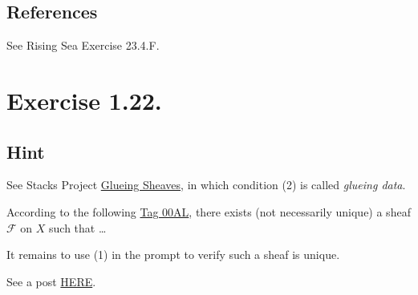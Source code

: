 \subsection{References}

See Rising Sea \cite{RaviRisingSea} Exercise 23.4.F.

\section{Exercise 1.22.}

\subsection{Hint}
See Stacks Project \href{https://stacks.math.columbia.edu/tag/00AK}{Glueing Sheaves}, in which condition (2) is called \textit{glueing data}. 

According to the following \href{https://stacks.math.columbia.edu/tag/00AL}{Tag 00AL}, there exists (not necessarily unique) a sheaf $\mathscr F$ on $X$ such that \dots

It remains to use (1) in the prompt to verify such a sheaf is unique.

See a post \href{https://math.stackexchange.com/questions/455706/gluing-sheaves-can-we-realize-mathcalfw-as-some-kind-of-limit}{HERE}.